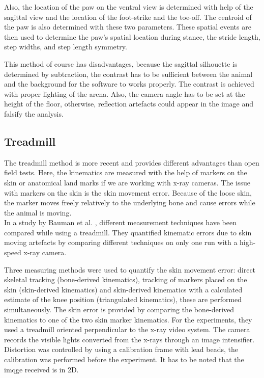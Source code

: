 Also, the location of the paw on the ventral view is determined with help of the sagittal view and the location of the foot-strike and the toe-off. The centroid of the paw is also determined with these two parameters. These spatial events are then used to determine the paw's spatial location during stance, the stride length, step widths, and step length symmetry.

This method of course has disadvantages, because the sagittal silhouette is determined by subtraction, the contrast has to be sufficient between the animal and the background for the software to works properly. The contrast is achieved with proper lighting of the arena. Also, the camera angle has to be set at the height of the floor, otherwise, reflection artefacts could appear in the image and falsify the analysis.

\subsection{Treadmill}

The treadmill method is more recent and provides different advantages than open field tests. Here, the kinematics are measured with the help of markers on the skin or anatomical land marks if we are working with x-ray cameras. The issue with markers on the skin is the skin movement error. Because of the loose skin, the marker moves freely relatively to the underlying bone and cause errors while the animal is moving. \\

In a study by Bauman et al. \cite{BAUMAN}, different measurement techniques have been compared while using a treadmill. They quantified kinematic errors due to skin moving artefacts by comparing different techniques on only one run with a high-speed x-ray camera.

Three measuring methods were used to quantify the skin movement error: direct skeletal tracking (bone-derived kinematics), tracking of markers placed on the skin (skin-derived kinematics) and skin-derived kinematics with a calculated estimate of the knee position (triangulated kinematics), these are performed simultaneously. The skin error is provided by comparing the bone-derived kinematics to one of the two skin marker kinematics. For the experiments, they used a treadmill oriented perpendicular to the x-ray video system. The camera records the visible lights converted from the x-rays through an image intensifier. Distortion was controlled by using a calibration frame with lead beads, the calibration was performed before the experiment. It has to be noted that the imqge received is in 2D.

